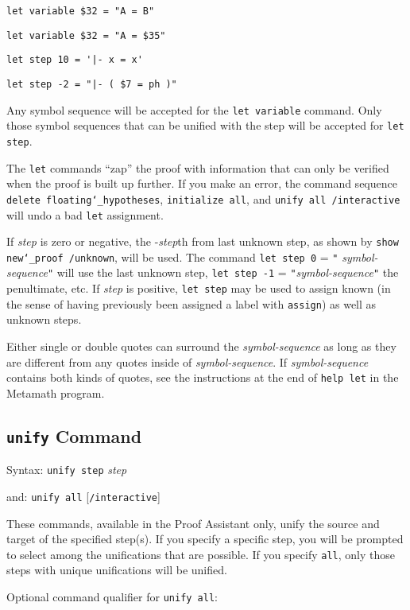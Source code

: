     \verb/let variable $32 = "A = B"/

    \verb/let variable $32 = "A = $35"/

    \verb/let step 10 = '|- x = x'/

    \verb/let step -2 = "|- ( $7 = ph )"/

Any symbol sequence will be accepted for the \texttt{let variable}
command.  Only those symbol sequences that can be unified with the step
will be accepted for \texttt{let step}.

The \texttt{let} commands ``zap'' the proof with information that can
only be verified when the proof is built up further.  If you make an
error, the command sequence \texttt{delete
floating{\char`\_}hypotheses}, \texttt{initialize all}, and
\texttt{unify all /interactive} will undo a bad \texttt{let} assignment.

If {\em step} is zero or negative, the -{\em step}th from last unknown
step, as shown by \texttt{show new{\char`\_}proof /unknown}, will be
used.  The command \texttt{let step 0} = \verb/"/{\em
symbol-sequence}\verb/"/ will use the last unknown step, \texttt{let
step -1} = \verb/"/{\em symbol-sequence}\verb/"/ the penultimate, etc.
If {\em step} is positive, \texttt{let step} may be used to assign known
(in the sense of having previously been assigned a label with
\texttt{assign}) as well as unknown steps.

Either single or double quotes can surround the {\em symbol-sequence} as
long as they are different from any quotes inside of {\em
symbol-sequence}.  If {\em symbol-sequence} contains both kinds of
quotes, see the instructions at the end of \texttt{help let} in the
Metamath program.


\subsection{\texttt{unify} Command}
Syntax:  \texttt{unify step} {\em step}

      and:   \texttt{unify all} [\texttt{/interactive}]

These commands, available in the Proof Assistant only, unify the source
and target of the specified step(s). If you specify a specific step, you
will be prompted to select among the unifications that are possible.  If
you specify \texttt{all}, only those steps with unique unifications will be
unified.

Optional command qualifier for \texttt{unify all}:


